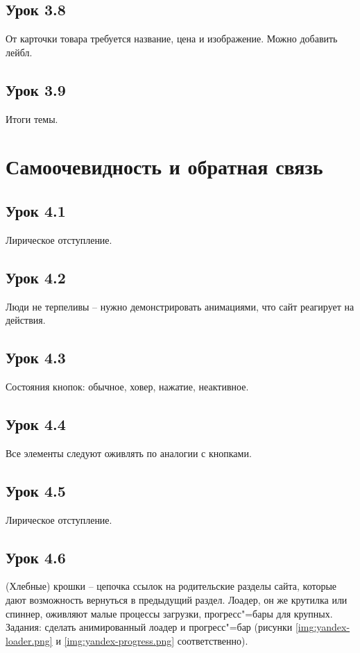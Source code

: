 \documentclass[variant=practice]{bsuir}
\begin{document}
\subsection{Урок 3.8} От карточки товара требуется название, цена и изображение.
Можно добавить лейбл.

\subsection{Урок 3.9} Итоги темы.

\section{Самоочевидность и обратная связь}

\subsection{Урок 4.1} Лирическое отступление.

\subsection{Урок 4.2} Люди не терпеливы -- нужно демонстрировать анимациями, что
сайт реагирует на действия.

\subsection{Урок 4.3} Состояния кнопок: обычное, ховер, нажатие, неактивное.

\subsection{Урок 4.4} Все элементы следуют оживлять по аналогии с кнопками.

\subsection{Урок 4.5} Лирическое отступление.

\subsection{Урок 4.6} (Хлебные) крошки -- цепочка ссылок на родительские разделы
сайта, которые дают возможность вернуться в предыдущий раздел. Лоадер, он же
крутилка или спиннер, оживляют малые процессы загрузки, прогресс"=бары для
крупных. Задания: сделать анимированный лоадер и прогресс"=бар (рисунки
\ref{img:yandex-loader.png} и \ref{img:yandex-progress.png} соответственно).
\end{document}
